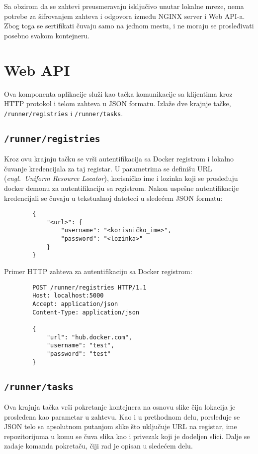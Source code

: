 \documentclass[12pt]{report}
\begin{document}
Sa obzirom da se zahtevi preusmeravaju isključivo unutar lokalne mreze, nema potrebe za šifrovanjem zahteva i odgovora između NGINX server i Web API-a. Zbog toga se sertifikati čuvaju samo na jednom mestu, i ne moraju se prosleđivati posebno svakom kontejneru.

\section{Web API}
Ova komponenta aplikacije služi kao tačka komunikacije sa klijentima kroz \acrshort{HTTP} protokol i telom zahteva u \acrshort{JSON} formatu. Izlaže dve krajnje tačke, \texttt{/runner/registries} i \texttt{/runner/tasks}.

\subsection{\texttt{/runner/registries}}

Kroz ovu krajnju tačku se vrši autentifikacija sa Docker registrom i lokalno čuvanje kredencijala za taj registar. U parametrima se definišu URL (\textit{engl.\ Uniform Resource Locator}), korisničko ime i lozinka koji se prosleđuju docker demonu za autentifikaciju sa registrom. Nakon uspešne autentifikacije kredencijali se čuvaju u tekstualnoj datoteci u sledećem \acrshort{JSON} formatu:

\begin{samepage}
    \begin{verbatim}
        {
            "<url>": {
                "username": "<korisničko_ime>",
                "password": "<lozinka>"
            }
        }
    \end{verbatim}
\end{samepage}

Primer \acrshort{HTTP} zahteva za autentifikaciju sa Docker registrom:
\begin{samepage}
    \begin{verbatim}
        POST /runner/registries HTTP/1.1
        Host: localhost:5000
        Accept: application/json
        Content-Type: application/json

        {
            "url": "hub.docker.com",
            "username": "test",
            "password": "test"
        }
    \end{verbatim}
\end{samepage}

\subsection{\texttt{/runner/tasks}}
Ova krajnja tačka vrši pokretanje kontejnera na osnovu slike čija lokacija je prosleđena kao parametar u zahtevu. Kao i u prethodnom delu, porsleđuje se \acrshort{JSON} telo sa apsolutnom putanjom slike što uključuje URL na registar, ime repozitorijuma u komu se čuva slika kao i privezak koji je dodeljen slici. Dalje se zadaje komanda pokretaču, čiji rad je opisan u sledećem delu.
\end{document}

